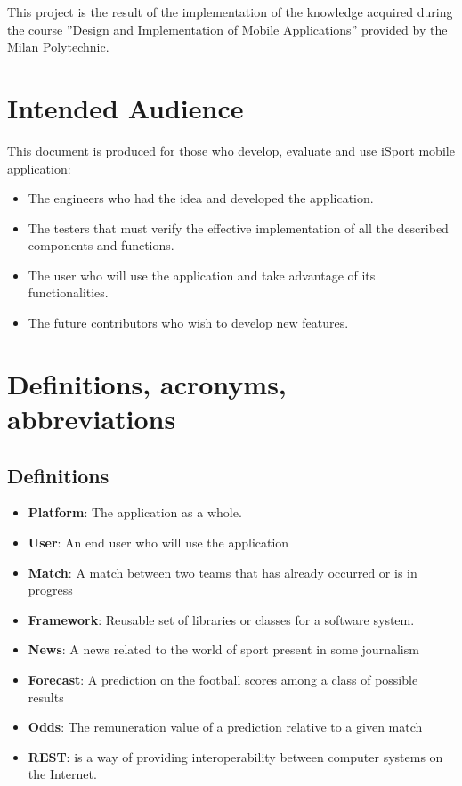 \documentclass[numbers=noenddot, 12pt, a4paper, oneside]{scrbook}
\begin{document}
This project is the result of the  implementation of the knowledge acquired during the course ”Design and Implementation of Mobile Applications” provided by the Milan Polytechnic.

\section{Intended Audience}
This document is produced for those who develop, evaluate and use iSport mobile application:
\begin{itemize}
	\item The engineers who had the idea and developed the application.
	\item The testers that must verify the effective implementation of all the described components and functions.
	\item The user who will use the application and take advantage of its functionalities.
	\item The future contributors who wish to develop new features.
\end{itemize}

\section{Definitions, acronyms, abbreviations}
\subsection*{Definitions}
\begin{itemize}
	\item \textbf{Platform}: The application as a whole.
	\item \textbf{User}: An end user who will use the application
	\item \textbf{Match}: A match between two teams that has already occurred or is in progress
	\item \textbf{Framework}: Reusable set of libraries or classes for a software system.
	\item \textbf{News}: A news related to the world of sport present in some journalism
	\item \textbf{Forecast}: A prediction on the football scores among a class of possible results
	\item \textbf{Odds}: The remuneration value of a prediction relative to a given match
	\item \textbf{REST}: is a way of providing interoperability between computer systems on the Internet.
\end{itemize}
\end{document}
